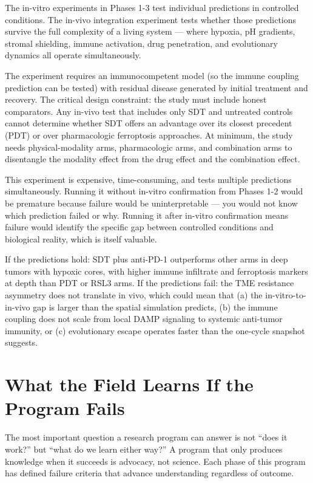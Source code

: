 \documentclass[11pt,twoside,openright]{report}
\begin{document}
The in-vitro experiments in Phases 1-3 test individual predictions in controlled conditions. The in-vivo integration experiment tests whether those predictions survive the full complexity of a living system --- where hypoxia, pH gradients, stromal shielding, immune activation, drug penetration, and evolutionary dynamics all operate simultaneously.

The experiment requires an immunocompetent model (so the immune coupling prediction can be tested) with residual disease generated by initial treatment and recovery. The critical design constraint: the study must include honest comparators. Any in-vivo test that includes only SDT and untreated controls cannot determine whether SDT offers an advantage over its closest precedent (PDT) or over pharmacologic ferroptosis approaches. At minimum, the study needs physical-modality arms, pharmacologic arms, and combination arms to disentangle the modality effect from the drug effect and the combination effect.

This experiment is expensive, time-consuming, and tests multiple predictions simultaneously. Running it without in-vitro confirmation from Phases 1-2 would be premature because failure would be uninterpretable --- you would not know which prediction failed or why. Running it after in-vitro confirmation means failure would identify the specific gap between controlled conditions and biological reality, which is itself valuable.

If the predictions hold: SDT plus anti-PD-1 outperforms other arms in deep tumors with hypoxic cores, with higher immune infiltrate and ferroptosis markers at depth than PDT or RSL3 arms. If the predictions fail: the TME resistance asymmetry does not translate in vivo, which could mean that (a) the in-vitro-to-in-vivo gap is larger than the spatial simulation predicts, (b) the immune coupling does not scale from local DAMP signaling to systemic anti-tumor immunity, or (c) evolutionary escape operates faster than the one-cycle snapshot suggests.

\section{What the Field Learns If the Program Fails}

The most important question a research program can answer is not ``does it work?'' but ``what do we learn either way?'' A program that only produces knowledge when it succeeds is advocacy, not science. Each phase of this program has defined failure criteria that advance understanding regardless of outcome.
\end{document}
